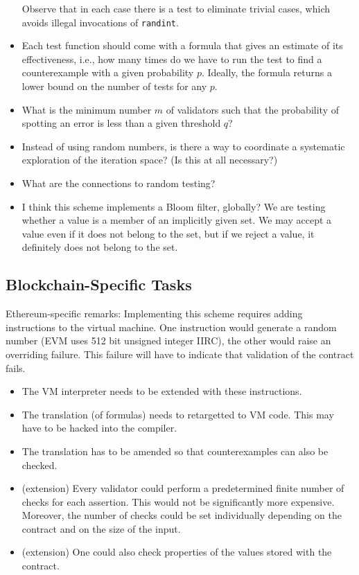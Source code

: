 \documentclass{article}
\newenvironment{ethereum}{%
  \begin{tcolorbox}[breakable,notitle,boxrule=0pt,colback=red!20,colframe=red!20]}{%
  \end{tcolorbox}}
\begin{document}
\begin{itemize}
  Observe that in each case there is a test to eliminate trivial cases, which avoids
  illegal invocations of \lstinline/randint/.
\item Each test function should come with a formula that gives an estimate of
  its effectiveness, i.e., how many times do we have to run the test to find a
  counterexample with a given probability $p$. Ideally, the formula returns a lower
  bound on the number of tests for any $p$.
\item What is the minimum number $m$ of validators such that the probability of
  spotting an error is less than a given threshold $q$?
\item Instead of using random numbers, is there a way to coordinate a systematic
  exploration of the iteration space? (Is this at all necessary?)
\item What are the connections to random testing? 
\item I think this scheme implements a Bloom filter, globally? We are testing whether a value is a
  member of an implicitly given set. We may accept a value even if it does not belong
  to the set, but if we reject a value, it definitely does not belong to the set.
\end{itemize}

\subsection{Blockchain-Specific Tasks}
\label{sec:blockch-spec-tasks}

\begin{ethereum}
  Ethereum-specific remarks:
  Implementing this scheme requires adding instructions to the virtual machine. One
  instruction would generate a random number (EVM uses 512 bit unsigned integer IIRC),
  the other would raise an overriding failure. This failure will have to indicate that
  validation of the contract fails.
\end{ethereum}

\begin{itemize}
\item The VM interpreter needs to be extended with these instructions.
\item The translation (of formulas) needs to retargetted to VM code. This may have to
  be hacked into the compiler.
\item The translation has to be amended so that counterexamples can also be checked.
\item (extension) Every validator could perform a predetermined finite number of checks for each
  assertion. This would not be significantly more expensive. Moreover, the number of
  checks could be set individually depending on the contract and on the size of the
  input.
\item (extension) One could also check properties of the values stored with the contract.
\end{itemize}
\end{document}
